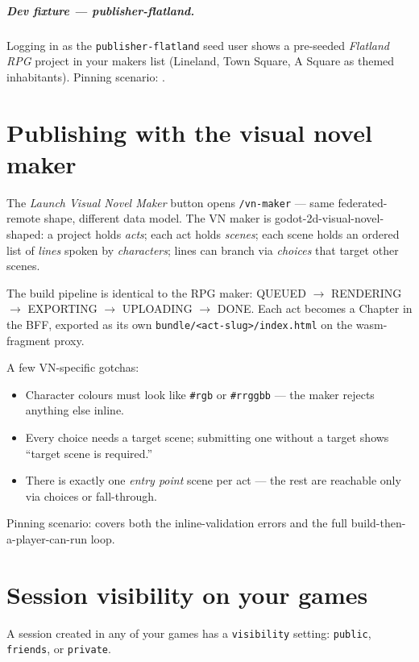 \documentclass[11pt,a4paper,openany]{book}
\begin{document}
\paragraph{Dev fixture --- publisher-flatland.} Logging in as the
\texttt{publisher-flatland} seed user shows a pre-seeded
\emph{Flatland RPG} project in your makers list (Lineland, Town
Square, A Square as themed inhabitants). Pinning scenario:
.

\chapter{Publishing with the visual novel maker}
The \emph{Launch Visual Novel Maker} button opens \texttt{/vn-maker} ---
same federated-remote shape, different data model. The VN maker is
godot-2d-visual-novel-shaped: a project holds \emph{acts}; each act
holds \emph{scenes}; each scene holds an ordered list of \emph{lines}
spoken by \emph{characters}; lines can branch via \emph{choices} that
target other scenes.

The build pipeline is identical to the RPG maker: QUEUED $\rightarrow$
RENDERING $\rightarrow$ EXPORTING $\rightarrow$ UPLOADING $\rightarrow$
DONE. Each act becomes a Chapter in the BFF, exported as its own
\texttt{bundle/<act-slug>/index.html} on the wasm-fragment proxy.

A few VN-specific gotchas:

\begin{itemize}
  \item Character colours must look like \texttt{\#rgb} or
        \texttt{\#rrggbb} --- the maker rejects anything else inline.
  \item Every choice needs a target scene; submitting one without a
        target shows ``target scene is required.''
  \item There is exactly one \emph{entry point} scene per act ---
        the rest are reachable only via choices or fall-through.
\end{itemize}

Pinning scenario: 
covers both the inline-validation errors and the full
build-then-a-player-can-run loop.

\chapter{Session visibility on your games}
A session created in any of your games has a
\texttt{visibility} setting: \texttt{public}, \texttt{friends},
or \texttt{private}.
\end{document}
